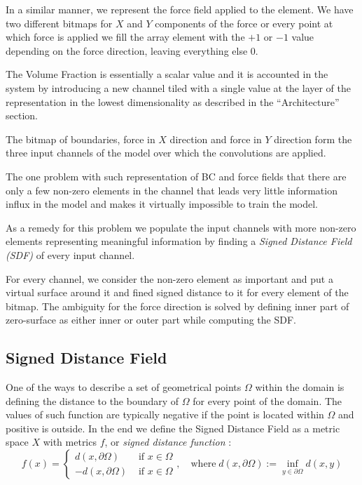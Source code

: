In a similar manner, we represent the force field applied to the element.
We have two different bitmaps for $X$ and $Y$ components of the force or every point at which force is applied we fill the array element with the $+1$ or $-1$ value depending on the force direction, leaving everything else $0$.
\medskip

The Volume Fraction is essentially a scalar value and it is accounted in the system by introducing a new channel tiled with a single value at the layer of the representation in the lowest dimensionality as described in the ``Architecture'' section.
\medskip

The bitmap of boundaries, force in $X$ direction and force in $Y$ direction form the three input channels of the model over which the convolutions are applied.
\medskip

The one problem with such representation of BC and force fields that there are only a few non-zero elements in the channel that leads very little information influx in the model and makes it virtually impossible to train the model.
\medskip

As a remedy for this problem we populate the input channels with more non-zero elements representing meaningful information by finding a \emph{Signed Distance Field (SDF)} of every input channel\cite{}.
\medskip

For every channel, we consider the non-zero element as important and put a virtual surface around it and fined signed distance to it for every element of the bitmap.
The ambiguity for the force direction is solved by defining inner part of zero-surface as either inner or outer part while computing the SDF.

\subsection{Signed Distance Field}

One of the ways to describe a set of geometrical points $\Omega$ within the domain is defining the distance to the boundary of $\Omega$ for every point of the domain. 
The values of such function are typically negative if the point is located within $\Omega$ and positive is outside.
In the end we define the Signed Distance Field as a metric space $X$ with metrics $f$, or \emph{signed distance function} :    
\[ 
f(x) = 
	\begin{cases}
			d(x, \partial \Omega) & \mbox{ if } x\in\Omega  \\
			-d(x, \partial \Omega) & \mbox{ if } x\in\Omega 
	\end{cases} 
	, \quad \mathrm{where} \; d(x, \partial \Omega) := \inf_{y \in \partial \Omega}d(x, y)
\]

